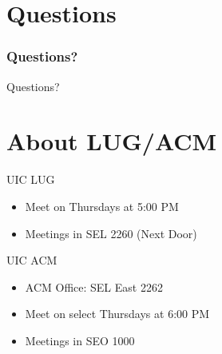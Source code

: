 \documentclass[hyperref={pdfpagelabels=false}]{beamer}
\begin{document}
\section{Questions}
\frame
{	
    \frametitle{Questions?}
    Questions?
}
\section{About LUG/ACM}
\frame
{	
    UIC LUG
    \begin{itemize}
    \item{Meet on Thursdays at 5:00 PM}
    \item{Meetings in SEL 2260 (Next Door)}
    \end{itemize}
    UIC ACM
    \begin{itemize}
    \item{ACM Office: SEL East 2262}
    \item{Meet on select Thursdays at 6:00 PM}
    \item{Meetings in SEO 1000}
    \end{itemize}
}
\end{document}
